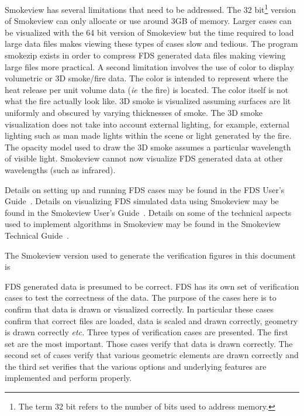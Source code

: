 \documentclass[11pt,twoside]{book}
\begin{document}
Smokeview has several limitations that need to be addressed.  The
32 bit\footnote{The term 32 bit refers to the number of bits used to address memory.}
version of Smokeview can only allocate or use around 3GB of memory.  Larger cases can be visualized
with the 64 bit version of Smokeview but the time required to load large data files makes viewing these types of cases slow and tedious.  The program smokezip exists in order to compress FDS generated data files making viewing large files more practical.  A second limitation involves the use of color to display volumetric or 3D smoke/fire data.  The color is intended to represent where the heat release per unit volume data ({\em ie}\ the fire) is located.  The color itself is not what the fire actually look like.  3D smoke is visualized assuming surfaces are lit uniformly and obscured by varying thicknesses of smoke.  The 3D smoke visualization does not take into account external lighting, for example, external lighting such as man made lights within the scene or light generated by the fire.  The opacity model used to draw the 3D smoke assumes a particular wavelength of visible light. Smokeview cannot now visualize FDS generated data at other wavelengths (such as infrared).

Details on setting up and
running FDS cases may be found in the FDS User's
Guide~\cite{FDS_Users_Guide_5}.  Details on visualizing FDS simulated data using Smokeview may
be found in the Smokeview User's Guide~\cite{Smokeview_Users_Guide_5}.  Details on some of the technical
aspects used to implement algorithms in Smokeview may be found in the Smokeview Technical Guide~\cite{Smokeview_Tech_Guide_5}.

The Smokeview version used to generate the verification figures in this document is
{

}

FDS generated data is presumed
to be correct.  FDS has its own set of verification cases to test the correctness of the data.
The purpose of the cases here is to confirm that data is drawn or visualized correctly.
In particular these cases confirm
that correct files are loaded, data is scaled and drawn correctly, geometry is drawn correctly
{\em etc.}   Three types of verification cases are presented. The first set are the most important. Those cases verify that data is drawn correctly.  The second set of
cases verify that various geometric elements are drawn correctly and the third set verifies
that the various options and underlying features are implemented and perform properly.
\end{document}
